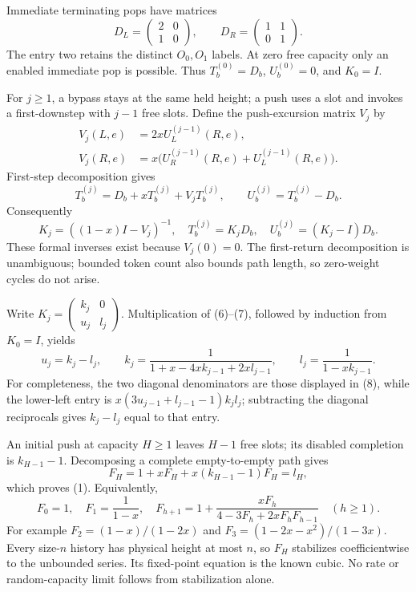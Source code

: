 \documentclass[11pt,letterpaper]{article}
\begin{document}
Immediate terminating pops have matrices \[
 D_L=\begin{pmatrix}2&0\\1&0\end{pmatrix},\qquad
 D_R=\begin{pmatrix}1&1\\0&1\end{pmatrix}.                     \tag{6}
\] The entry two retains the distinct \(O_0,O_1\) labels. At zero free
capacity only an enabled immediate pop is possible. Thus
\(T_b^{(0)}=D_b\), \(U_b^{(0)}=0\), and \(K_0=I\).

For \(j\ge1\), a bypass stays at the same held height; a push uses a
slot and invokes a first-downstep with \(j-1\) free slots. Define the
push-excursion matrix \(V_j\) by \[
\begin{aligned}
 V_j(L,e)&=2xU_L^{(j-1)}(R,e),\\
 V_j(R,e)&=x\bigl(U_R^{(j-1)}(R,e)+U_L^{(j-1)}(R,e)\bigr).
\end{aligned}
\] First-step decomposition gives \[
 T_b^{(j)}=D_b+xT_b^{(j)}+V_jT_b^{(j)},\qquad
 U_b^{(j)}=T_b^{(j)}-D_b.
\] Consequently \[
 K_j=((1-x)I-V_j)^{-1},\quad T_b^{(j)}=K_jD_b,\quad
 U_b^{(j)}=(K_j-I)D_b.                                      \tag{7}
\] These formal inverses exist because \(V_j(0)=0\). The first-return
decomposition is unambiguous; bounded token count also bounds path
length, so zero-weight cycles do not arise.

Write
\(K_j=\left(\begin{smallmatrix}k_j&0\\u_j&l_j\end{smallmatrix}\right)\).
Multiplication of (6)--(7), followed by induction from \(K_0=I\), yields
\[
 u_j=k_j-l_j,\qquad
 k_j=\frac1{1+x-4xk_{j-1}+2xl_{j-1}},\qquad
 l_j=\frac1{1-xk_{j-1}}.                                    \tag{8}
\] For completeness, the two diagonal denominators are those displayed
in (8), while the lower-left entry is \(x(3u_{j-1}+l_{j-1}-1)k_jl_j\);
subtracting the diagonal reciprocals gives \(k_j-l_j\) equal to that
entry.

An initial push at capacity \(H\ge1\) leaves \(H-1\) free slots; its
disabled completion is \(k_{H-1}-1\). Decomposing a complete
empty-to-empty path gives \[F_H=1+xF_H+x(k_{H-1}-1)F_H=l_H,\] which
proves (1). Equivalently, \[
 F_0=1,\quad F_1=\frac1{1-x},\quad
 F_{h+1}=1+\frac{xF_h}{4-3F_h+2xF_hF_{h-1}}\quad(h\ge1).
\] For example \(F_2=(1-x)/(1-2x)\) and \(F_3=(1-2x-x^2)/(1-3x)\). Every
size-\(n\) history has physical height at most \(n\), so \(F_H\)
stabilizes coefficientwise to the unbounded series. Its fixed-point
equation is the known cubic. No rate or random-capacity limit follows
from stabilization alone.
\end{document}
